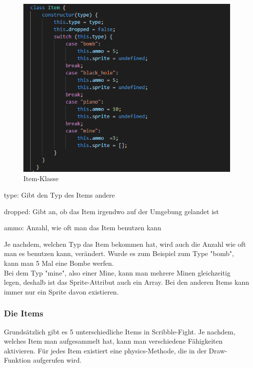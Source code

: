\begin{figure}[H]
    \centering
    \includegraphics[scale=1]{pics/itemClass.PNG}
    \caption{Item-Klasse}
\end{figure}

\begin{compactitem}
    \item type: Gibt den Typ des Items andere
    \item dropped: Gibt an, ob das Item irgendwo auf der Umgebung gelandet ist
    \item ammo: Anzahl, wie oft man das Item benutzen kann
\end{compactitem}

Je nachdem, welchen Typ das Item bekommen hat, wird auch die Anzahl wie oft
 man es benutzen kann, verändert. 
Wurde es zum Beispiel zum Type "bomb", kann man 5 Mal eine Bombe werfen.
\\
Bei dem Typ "mine", also einer Mine, kann man mehrere Minen gleichzeitig legen, deshalb ist das Sprite-Attribut auch ein Array.
Bei den anderen Items kann immer nur ein Sprite davon existieren.




\subsubsection{Die Items}  \label{impl:items}
Grundsätzlich gibt es 5 unterschiedliche Items in Scribble-Fight. Je nachdem, welches Item man aufgesammelt hat, kann man verschiedene Fähigkeiten aktivieren.
Für jedes Item existiert eine physics-Methode, die in der Draw-Funktion aufgerufen wird. 

